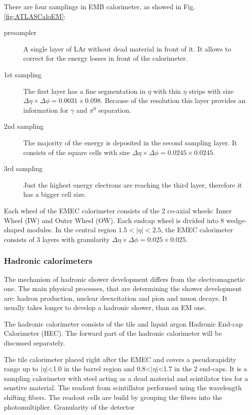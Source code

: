 There are four samplings in EMB calorimeter, as showed in Fig. \ref{fig:ATLASCaloEM}:
\begin{description}
\item [presampler] A single layer of LAr without dead material in front of it. It allows to correct for the energy losses in front of the calorimeter. 
\item [1st sampling] The first layer has a fine segmentation in $\eta$ with thin $\eta$ strips with size $\Delta \eta \times \Delta \phi = 0.0031 \times 0.098$. Because of the resolution this layer provides an information for $\gamma$ and $\pi^0$ separation.
\item [2nd sampling] The majority of the energy is deposited in the second sampling layer. It consists of the square cells with size $\Delta \eta \times \Delta \phi = 0.0245 \times 0.0245$.
\item [3rd sampling] Just the highest energy electrons are reaching the third layer, therefore it has a bigger cell size.
\end{description} 

Each wheel of the EMEC calorimeter consists of the 2 co-axial wheels: Inner Wheel (IW) and Outer Wheel (OW). Each endcap wheel is divided into 8 wedge-shaped modules. In the central region $1.5<|\eta|<2.5$, the EMEC calorimeter consists of 3 layers with granularity $\Delta \eta \times \Delta \phi = 0.025 \times 0.025$. 

\subsubsection{Hadronic calorimeters}

The mechanism of hadronic shower development differs from the electromagnetic one. The main physical processes, that are determining the shower development are: hadron production, nuclear deexcitation and pion and muon decays. It usually takes longer to develop a hadronic shower, than an EM one.

The \atlas hadronic calorimeter consists of the tile and liquid argon Hadronic End-cap Calorimeter (HEC). The forward part of the hadronic calorimeter will be discussed separately.

The tile calorimeter placed right after the EMEC and covers a pseudorapidity range up to $|\eta|$<1.0 in the barrel region and 0.8<$|\eta|$<1.7 in the 2 end-caps. It is a sampling calorimeter with steel acting as a dead material and scintilator ties for a senstive material. The readout from scintillator performed using the wavelength shifting fibers.  The readout cells are build by grouping the fibers into the photomultiplier. Granularity of the detector

